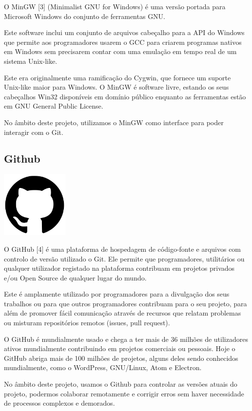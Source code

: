 \documentclass[a4paper,12pt]{article}
\begin{document}
O MinGW [3] (Minimalist GNU for Windows) é uma versão portada para Microsoft Windows do conjunto de ferramentas GNU. 

Este software inclui um conjunto de arquivos cabeçalho para a API do Windows que permite aos programadores usarem o GCC para criarem programas nativos em Windows sem precisarem contar com uma emulação em tempo real de um sistema Unix-like.

Este era originalmente uma ramificação do Cygwin, que fornece um suporte Unix-like maior para Windows. O MinGW é software livre, estando os seus cabeçalhos Win32 disponíveis em domínio público enquanto as ferramentas estão em GNU General Public License.

No âmbito deste projeto, utilizamos o MinGW como interface para poder interagir com o Git.

\subsection{Github}
    \includegraphics[width=0.25\textwidth]{github.png} %
    \vspace{0.5cm}

O GitHub [4] é uma plataforma de hospedagem de código-fonte e arquivos com controlo de versão utilizado o Git. Ele permite que programadores, utilitários ou qualquer utilizador registado na plataforma contribuam em projetos privados e/ou Open Source de qualquer lugar do mundo. 

Este é amplamente utilizado por programadores para a divulgação dos seus trabalhos ou para que outros programadores contribuam para o seu projeto, para além de promover fácil comunicação através de recursos que relatam problemas ou misturam repositórios remotos (issues, pull request).

O GitHub é mundialmente usado e chega a ter mais de 36 milhões de utilizadores ativos mundialmente contribuindo em projetos comerciais ou pessoais. Hoje o GitHub abriga mais de 100 milhões de projetos, alguns deles sendo conhecidos mundialmente, como o WordPress, GNU/Linux, Atom e Electron.

No âmbito deste projeto, usamos o Github para controlar as versões atuais do projeto, podermos colaborar remotamente e corrigir erros sem haver necessidade de processos complexos e demorados.
\end{document}
